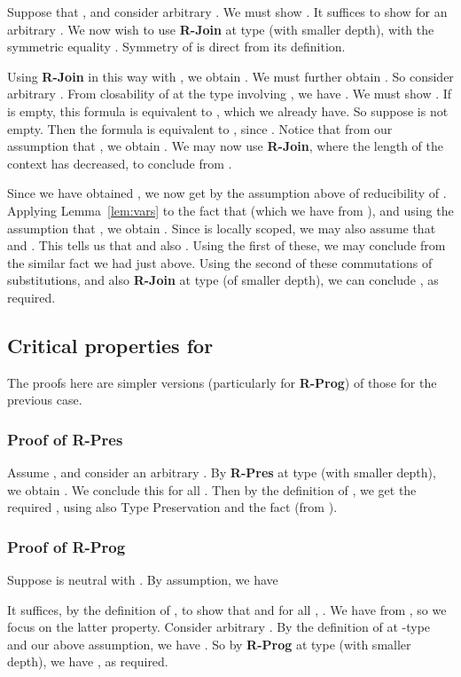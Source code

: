 \documentclass[copyright]{eptcs}
\begin{document}
Suppose that , and consider arbitrary
.  We must show
.  It suffices to show
 for an arbitrary
.  We now wish to use
\textbf{R-Join} at type  (with smaller depth), with the
symmetric equality .  Symmetry of  is
direct from its definition.

Using \textbf{R-Join} in this way with , we obtain
.  We must further obtain
.  So consider arbitrary
.  From closability of  at the type
involving , we have .
We must show .  If
 is empty, this formula is equivalent to
, which we already have.  So suppose
 is not empty.  Then the formula is equivalent to , since
.  Notice that from our assumption that
, we obtain .  We may
now use \textbf{R-Join}, where the length of the context has
decreased, to conclude  from .

Since we have obtained , we now get
 by the assumption above
of reducibility of .  Applying Lemma~\ref{lem:vars} to the fact
that  (which we have from
), and using the assumption that
, we obtain .
Since  is locally scoped, we may also assume that
 and . This tells
us that  and also
.  Using the first of these, we
may conclude  from the
similar fact we had just above.  Using the second of these
commutations of substitutions, and also \textbf{R-Join} at type
 (of smaller depth), we can conclude
, as required.

\subsection{Critical properties for }

The proofs here are simpler versions (particularly for
\textbf{R-Prog}) of those for the previous case.

\subsubsection{Proof of \textbf{R-Pres}}

Assume , and consider an
arbitrary .  By \textbf{R-Pres} at type
 (with smaller depth), we obtain
.  We conclude this for all
.  Then by the definition of
, we get the required , using also Type Preservation and the fact
 (from ).

\subsubsection{Proof of \textbf{R-Prog}}

Suppose  is neutral with .  By assumption, we have


\noindent It suffices, by the definition of , to show
that  and for all ,
. We have  from
, so we focus on the latter property.  Consider
arbitrary .  By the definition of
 at -type and our above assumption, we have
.  So by \textbf{R-Prog} at
type  (with smaller depth), we have
, as required.
\end{document}
